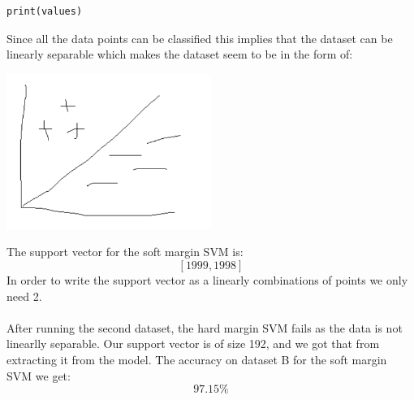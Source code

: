 \documentclass{article}
\begin{document}
\begin{titlepage}
\begin{lstlisting}
print(values)
\end{lstlisting}
Since all the data points can be classified this implies that the dataset can be linearly separable which makes the dataset seem to be in the form of: \\
\begin{center}
\includegraphics[width=0.5\textwidth]{g4.png}
\end{center}
The support vector for the soft margin SVM is:
\[ [1999,  1998] \]
In order to write the support vector as a linearly combinations of points we only need 2.\\\\
After running the second dataset, the hard margin SVM fails as the data is not linearlly separable. Our support vector is of size 192, and we got that from extracting it from the model. The accuracy on dataset B for the soft margin SVM we get:
\[ 97.15\%\]
\end{titlepage}
\end{document}
